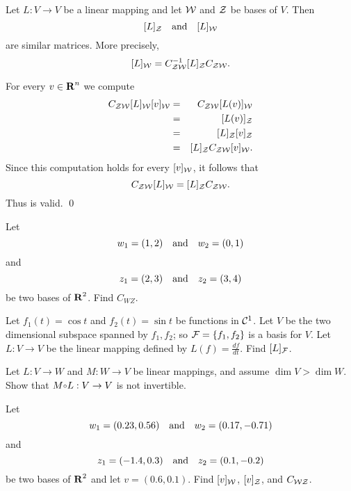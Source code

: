 \begin{thm} \label{T:matrixcoord}
Let $L:V\to V$ be a linear mapping and let
${\cal W}$ and ${\cal Z}$ be bases of $V$.  Then
\[
[L]_{\cal Z} \quad\mbox{and}\quad [L]_{\cal W}
\]
are similar  matrices.  More precisely,
\begin{equation}  \label{e:matrixcoord}
[L]_{\cal W} = C_{{\cal Z}{\cal W}}^{-1} [L]_{\cal Z} C_{{\cal Z}{\cal W}}.
\end{equation}
\end{thm}

\proof  For every $v\in\mbox{$\bf{R}$}^n$ we compute
\begin{eqnarray*}
C_{{\cal Z}{\cal W}}[L]_{\cal W}[v]_{\cal W} & = &
C_{{\cal Z}{\cal W}}[L(v)]_{\cal W} \\
& = & [L(v)]_{\cal Z}  \\
& = & [L]_{\cal Z}[v]_{\cal Z} \\
& = & [L]_{\cal Z} C_{{\cal Z}{\cal W}}[v]_{\cal W}.
\end{eqnarray*}
Since this computation holds for every $[v]_{\cal W}$, it follows that
\[
C_{{\cal Z}{\cal W}}[L]_{\cal W} = [L]_{\cal Z} C_{{\cal Z}{\cal W}}.
\]
Thus  is valid.  \qed





\EXER

\TEXER

\begin{exercise} \label{c7.1.2}
Let
\[
w_1 = (1,2) \quad\mbox{and}\quad w_2 = (0,1)
\]
and
\[
z_1 = (2,3) \quad\mbox{and}\quad z_2 = (3,4)
\]
be two bases of $\mbox{$\bf{R}$}^2$.  Find $C_{WZ}$.
\end{exercise}



\begin{exercise} \label{c7.3.2}
Let $f_1(t)=\cos t$ and $f_2(t)=\sin t$ be functions in ${\cal C}^1$.
Let $V$ be the two dimensional subspace spanned by $f_1,f_2$; so
${\cal F}=\{f_1,f_2\}$ is a basis for $V$.  Let $L:V\to V$ be the
linear mapping defined by $L(f)=\frac{df}{dt}$.  Find $[L]_{\cal F}$.
\end{exercise}

\begin{exercise} \label{c7.3.3}
Let $L:V\to W$ and $M:W\to V$ be linear mappings, and assume $\dim V > \dim W$.
Show that $M\compose L:V\to V$ is not invertible.
\end{exercise}

\CEXER

\begin{exercise} \label{c7.1.5}
Let
\[
w_1 = (0.23,0.56) \quad\mbox{and}\quad w_2 = (0.17,-0.71)
\]
and
\[
z_1 = (-1.4,0.3) \quad\mbox{and}\quad z_2 = (0.1,-0.2)
\]
be two bases of $\mbox{$\bf{R}$}^2$ and let $v=(0.6,0.1)$.  Find $[v]_{\cal
W}$, $[v]_{\cal Z}$, and $C_{\cal WZ}$.
\end{exercise}

